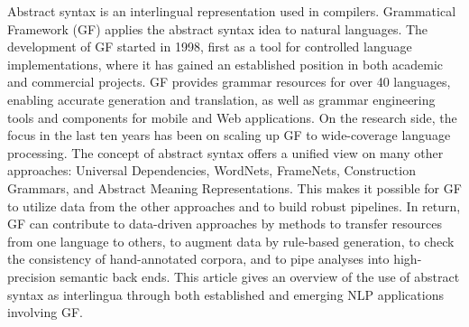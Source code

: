 Abstract syntax is an interlingual representation used in compilers. Grammatical Framework (GF) applies the abstract syntax idea to natural languages. The development of GF started in 1998, first as a tool for controlled language implementations, where it has gained an established position in both academic and commercial projects. GF provides grammar resources for over 40 languages, enabling accurate generation and translation, as well as grammar engineering tools and components for mobile and Web applications. On the research side, the focus in the last ten years has been on scaling up GF to wide-coverage language processing. The concept of abstract syntax offers a unified view on many other approaches: Universal Dependencies, WordNets, FrameNets, Construction Grammars, and Abstract Meaning Representations. This makes it possible for GF to utilize data from the other approaches and to build robust pipelines. In return, GF can contribute to data-driven approaches by methods to transfer resources from one language to others, to augment data by rule-based generation, to check the consistency of hand-annotated corpora, and to pipe analyses into high-precision semantic back ends. This article gives an overview of the use of abstract syntax as interlingua through both established and emerging NLP applications involving GF.